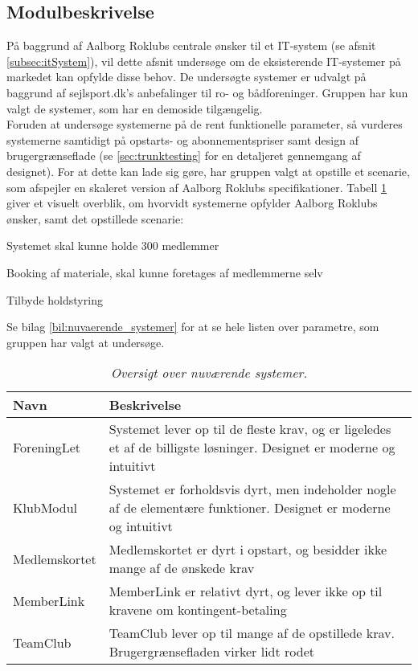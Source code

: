 \subsection{Modulbeskrivelse}
\label{sec:modulbeskrivelse} %
På baggrund af Aalborg Roklubs centrale ønsker til et IT-system (se afsnit \ref{subsec:itSystem}), vil dette afsnit undersøge om de eksisterende IT-systemer på markedet kan opfylde disse behov. De undersøgte systemer er udvalgt på baggrund af sejlsport.dk’s \cite{Sejlsport_system} anbefalinger til ro- og bådforeninger. Gruppen har kun valgt de systemer, som har en demoside tilgængelig.\\

Foruden at undersøge systemerne på de rent funktionelle parameter, så vurderes systemerne samtidigt på opstarts- og abonnementspriser samt design af brugergrænseflade (se \ref{sec:trunktesting} for en detaljeret gennemgang af designet). For at dette kan lade sig gøre, har gruppen valgt at opstille et scenarie, som afspejler en skaleret version af Aalborg Roklubs specifikationer. Tabell \ref{tab:nuvaerende_systemer} giver et visuelt overblik, om hvorvidt systemerne opfylder Aalborg Roklubs ønsker, samt det opstillede scenarie:
\begin{itemize_small}
\item Systemet skal kunne holde 300 medlemmer
\item Booking af materiale, skal kunne foretages af medlemmerne selv
\item Tilbyde holdstyring
\end{itemize_small}
Se bilag \ref{bil:nuvaerende_systemer} for at se hele listen over parametre, som gruppen har valgt at undersøge.
\begin{table}[H]
    \begin{tabularx}{\textwidth}{l|X}
    \textbf{Navn}          & \textbf{Beskrivelse} \\ \hline \hline
    ForeningLet   & Systemet lever op til de fleste krav, og er ligeledes et af de billigste løsninger. Designet er moderne og intuitivt \\ \hline 
    KlubModul     & Systemet er forholdsvis dyrt, men indeholder nogle af de elementære funktioner. Designet er moderne og intuitivt \\ \hline 
    Medlemskortet & Medlemskortet er dyrt i opstart, og besidder ikke mange af de ønskede krav \\ \hline 
    MemberLink    & MemberLink er relativt dyrt, og lever ikke op til kravene om kontingent-betaling \\ \hline 
    TeamClub      & TeamClub lever op til mange af de opstillede krav. Brugergrænsefladen virker lidt rodet \\
    \end{tabularx}
    \caption{\textit{Oversigt over nuværende systemer. \tabelgroup}}
    \label{tab:nuvaerende_systemer}
\end{table} 

